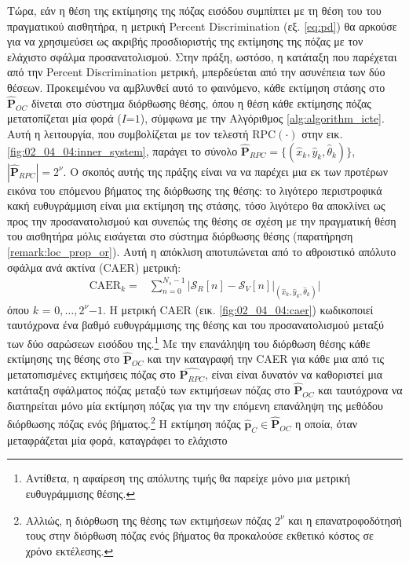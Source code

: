 Τώρα, εάν η θέση της εκτίμησης της πόζας εισόδου συμπίπτει με τη θέση του του
πραγματικού αισθητήρα, η μετρική Percent Discrimination (εξ. \ref{eq:pd}) θα
αρκούσε για να χρησιμεύσει ως ακριβής προσδιοριστής της εκτίμησης της πόζας με
τον ελάχιστο σφάλμα προσανατολισμού. Στην πράξη, ωστόσο, η κατάταξη που
παρέχεται από την Percent Discrimination μετρική, μπερδεύεται από την ασυνέπεια
των δύο θέσεων.  Προκειμένου να αμβλυνθεί αυτό το φαινόμενο, κάθε εκτίμηση
στάσης στο $\hat{\bm{P}}_{OC}$ δίνεται στο σύστημα διόρθωσης θέσης, όπου η θέση
κάθε εκτίμησης πόζας μετατοπίζεται μία φορά ($I$=$1$), σύμφωνα με την
Αλγόριθμος \ref{alg:algorithm_icte}. Αυτή η λειτουργία, που συμβολίζεται με τον
τελεστή RPC$(\cdot)$ στην εικ. \ref{fig:02_04_04:inner_system}, παράγει το σύνολο
$\hat{\bm{P}}_{RPC} = \{(\hat{x}_k, \hat{y}_k, \hat{\theta}_k)\}$,
$|\hat{\bm{P}}_{RPC}| = 2^\nu$.  Ο σκοπός αυτής της πράξης είναι να να παρέχει
μια εκ των προτέρων εικόνα του επόμενου βήματος της διόρθωσης της θέσης: το
λιγότερο περιστροφικά κακή ευθυγράμμιση είναι μια εκτίμηση της στάσης, τόσο
λιγότερο θα αποκλίνει ως προς την προσανατολισμού και συνεπώς της θέσης σε
σχέση με την πραγματική θέση του αισθητήρα μόλις εισάγεται στο σύστημα
διόρθωσης θέσης (παρατήρηση \ref{remark:loc_prop_or}). Αυτή η απόκλιση
αποτυπώνεται από το αθροιστικό απόλυτο σφάλμα ανά ακτίνα (CAER) μετρική:
\begin{align}
  \text{CAER}_k = & \sum\limits_{n=0}^{N_s-1} \Bigg| \mathcal{S}_R[n] - \mathcal{S}_V[n]\Big|_{(\hat{x}_k, \hat{y}_k, \hat{\theta}_k)} \Bigg|
  \label{eq:caer}
\end{align}
όπου $k$ = $0,\dots,2^\nu$$-$$1$. Η μετρική CAER (εικ. \ref{fig:02_04_04:caer})
κωδικοποιεί ταυτόχρονα ένα βαθμό ευθυγράμμισης της θέσης και του
προσανατολισμού μεταξύ των δύο σαρώσεων εισόδου της.\footnote{Αντίθετα, η
αφαίρεση της απόλυτης τιμής θα παρείχε μόνο μια μετρική ευθυγράμμισης θέσης.}
Με την επανάληψη του διόρθωση θέσης κάθε εκτίμησης της θέσης στο
$\hat{\bm{P}}_{OC}$ και την καταγραφή την CAER για κάθε μια από τις
μετατοπισμένες εκτιμήσεις πόζας στο $\hat{\bm{P}_{RPC}}$, είναι είναι δυνατόν
να καθοριστεί μια κατάταξη σφάλματος πόζας μεταξύ των εκτιμήσεων πόζας στο
$\hat{\bm{P}}_{OC}$ και ταυτόχρονα να διατηρείται μόνο μία εκτίμηση πόζας για
την την επόμενη επανάληψη της μεθόδου διόρθωσης πόζας ενός
βήματος.\footnote{Αλλιώς, η διόρθωση της θέσης των εκτιμήσεων πόζας $2^\nu$ και
η επανατροφοδότησή τους στην διόρθωση πόζας ενός βήματος θα προκαλούσε εκθετικό
κόστος σε χρόνο εκτέλεσης.} Η εκτίμηση πόζας $\hat{\bm{p}}_C \in
\hat{\bm{P}}_{OC}$ η οποία, όταν μεταφράζεται μία φορά, καταγράφει το ελάχιστο
